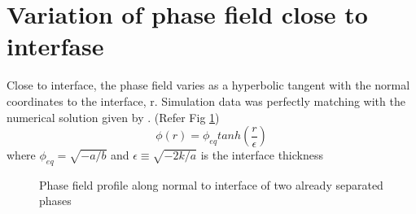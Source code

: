 \documentclass{article}
\begin{document}
\section{Variation of phase field close to interfase}
Close to interface, the phase field varies as a hyperbolic tangent with the normal coordinates to the interface, r. Simulation data was perfectly matching with the numerical solution given by \cite{arXiv:1104.0078}. (Refer Fig \ref*{fig:tanh}) \newline
\begin{equation}
	\phi(r) = \phi_{eq}tan h(\frac{r}{\epsilon})
\end{equation}
where $\phi_{eq} = \sqrt{-a/b}$ and $\epsilon \equiv \sqrt{-2k/a}$ is the interface thickness
\begin{figure}[h!]
	\begin{center}
		\caption{Phase field profile along normal to interface of two already separated phases }
		\label{fig:tanh}
	\end{center}

\end{figure}
\end{document}
